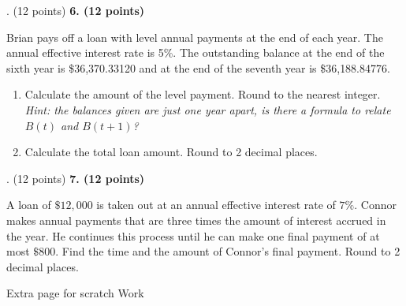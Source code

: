 \documentclass[12pt]{article}
\makeatletter
\newenvironment{problem}[1][]{%
  \bigskip%
  \noindent\begin{boxedminipage}{\columnwidth}%
  \def\@tempa{#1}%
  \ifx\@tempa\empty\else%
    \textbf{#1}\hspace{0.5em}%
  \fi%
}{%
  \end{boxedminipage}%
}
\makeatother
\begin{document}
\newpage

\begin{problem}[6. (12 points)]
Brian pays off a loan with level annual payments at the end of each year. The annual
effective interest rate is 5\%. The outstanding balance at the end of the sixth year is
\$36{,}370.33120 and at the end of the seventh year is \$36{,}188.84776.

\begin{enumerate}
    \item[(a)] Calculate the amount of the level payment. Round to the nearest integer. 
    \textit{Hint: the balances given are just one year apart, is there a formula to relate $B(t)$ and $B(t+1)$?}
    \item[(b)] Calculate the total loan amount. Round to 2 decimal places.
\end{enumerate}
\end{problem}


\newpage


\begin{problem}[7. (12 points)]
A loan of $\$12,000$ is taken out at an annual effective interest rate of $7\%$. Connor makes annual payments that are three times the amount of interest accrued in the year. He continues this process until he can make one final payment of at most $\$800$. Find the time and the amount of Connor's final payment. Round to 2 decimal places.
\end{problem}

\newpage
Extra page for scratch Work
\end{document}
